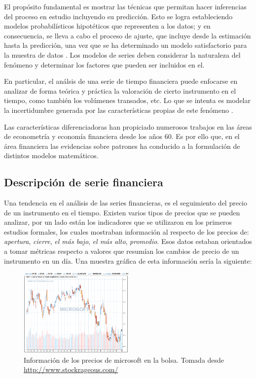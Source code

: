 El propósito fundamental es mostrar las técnicas que permitan hacer inferencias
del proceso en estudio incluyendo su predicción. Esto se logra estableciendo
modelos probabilísticos hipotéticos que representen a los datos; y en
consecuencia, se lleva a cabo el proceso de ajuste, que incluye desde la
estimación hasta la predicción, una vez que se ha determinado un modelo
satisfactorio para la muestra de datos \cite{box2011time}
\cite{vandaele1983applied}. Los modelos de series deben considerar la
naturaleza del fenómeno y determinar los factores que pueden ser incluidos en
el.

En particular, el análsis de una serie de tiempo financiera puede enfocarse en
analizar de forma teórica y práctica la valoración de cierto instrumento en el
tiempo, como también los volúmenes transados, etc. Lo que se intenta es modelar
la incertidumbre generada por las características propias de este fenómeno
\cite{tsay2005analysis}. 

Las características diferenciadoras han propiciado numerosos trabajos en las
áreas de econometría y economía financiera desde los años 60. Es por ello que,
en el área financiera las evidencias sobre patrones ha conducido a la
formulación de distintos modelos matemáticos.

\subsection{Descripción de serie financiera}

Una tendencia en el análisis de las series financieras, es el seguimiento del
precio de un instrumento en el tiempo.
Existen varios tipos de precios que se pueden analizar, por un lado están los
indicadores que se utilizaron en los primeros estudios formales, los cuales
mostraban información al respecto de los precios de: \emph{apertura},
\emph{cierre}, \emph{el más bajo}, \emph{el más alto}, \emph{promedio}. Esos
datos estaban orientados a tomar métricas respecto a valores que resumían los
cambios de precio de un instrumento en un día. Una muestra gráfica de esta
información sería la siguiente:

\begin{figure}[h!t]
    \begin{center}
        \includegraphics[width=0.5\textwidth]{images/microsoft}
        \caption{Información de los precios de microsoft en la bolsa.
Tomada desde \url{http://www.stockrageous.com/}}
    \end{center}
\end{figure}

